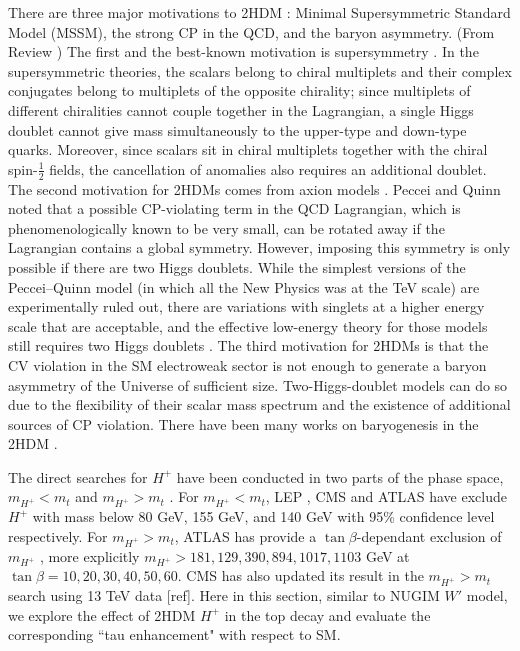There are three major motivations to 2HDM \cite{BRANCO20121}: Minimal Supersymmetric Standard Model (MSSM), the strong CP in the QCD, and the baryon asymmetry. (From Review \cite{BRANCO20121}) The first and the best-known motivation is supersymmetry \cite{HABER198575}. In the supersymmetric theories, the scalars belong to chiral multiplets and their complex conjugates belong to multiplets of the opposite chirality; since multiplets of different chiralities cannot couple together in the Lagrangian, a single Higgs doublet cannot give mass simultaneously to the upper-type and down-type quarks. Moreover, since scalars sit in chiral multiplets together with the chiral spin-$\frac{1}{2}$ fields, the cancellation of anomalies also requires an additional doublet. The second motivation for 2HDMs comes from axion models \cite{KIM19871}. Peccei and Quinn \cite{PhysRevLett.38.1440} noted that a possible CP-violating term in the QCD Lagrangian, which is phenomenologically known to be very small, can be rotated away if the Lagrangian contains a global symmetry. However, imposing this symmetry is only possible if there are two Higgs doublets. While the simplest versions of the Peccei–Quinn model (in which all the New Physics was at the TeV scale) are experimentally ruled out, there are variations with singlets at a higher energy scale that are acceptable, and the effective low-energy theory for those models still requires two Higgs doublets \cite{KIM19871}. The third motivation for 2HDMs is that the CV violation in the SM electroweak sector is not enough \cite{Trodden:1998qg} to generate a baryon asymmetry of the Universe of sufficient size. Two-Higgs-doublet models can do so due to the flexibility of their scalar mass spectrum \cite{Trodden:1998qg} and the existence of additional sources of CP violation. There have been many works on baryogenesis in the 2HDM \cite{TUROK1991471, Joyce:1994zt}. 

The direct searches for $H^+$ have been conducted in two parts of the phase space, $m_{H^+} < m_t$  and $m_{H^+} > m_t$ \cite{pdg2020}. For $m_{H^+} < m_t$, LEP \cite{Abbiendi:2013hk}, CMS \cite{Khachatryan:2015qxa} and ATLAS \cite{Aad:2014kga} have exclude $H^+$ with mass below 80 GeV, 155 GeV, and 140 GeV with 95\% confidence level respectively. For $m_{H^+} > m_t$, ATLAS has provide a $\tan\beta$-dependant exclusion of $m_{H^+}$ \cite{Aaboud:2018gjj}, more explicitly $m_{H^+}>181,129,390,894,1017,1103$ GeV at $\tan\beta=10,20,30,40,50,60$. CMS has also updated its result in the $m_{H^+} > m_t$ search using 13 TeV data [ref]. Here in this section, similar to NUGIM $W'$ model, we explore the effect of 2HDM $H^+$ in the top decay and evaluate the corresponding ``tau enhancement" with respect to SM.







